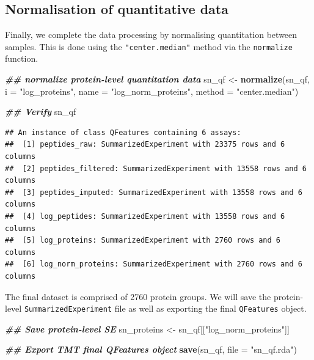 \documentclass[9pt,a4paper,]{extarticle}
\newenvironment{Shaded}{\begin{snugshade}}{\end{snugshade}}
\newcommand{\AttributeTok}[1]{\textcolor[rgb]{0.13,0.29,0.53}{#1}}
\newcommand{\DocumentationTok}[1]{\textcolor[rgb]{0.56,0.35,0.01}{\textbf{\textit{#1}}}}
\newcommand{\FunctionTok}[1]{\textcolor[rgb]{0.13,0.29,0.53}{\textbf{#1}}}
\newcommand{\NormalTok}[1]{#1}
\newcommand{\OtherTok}[1]{\textcolor[rgb]{0.56,0.35,0.01}{#1}}
\newcommand{\StringTok}[1]{\textcolor[rgb]{0.31,0.60,0.02}{#1}}
\begin{document}
\subsection{Normalisation of quantitative data}\label{normalisation-of-quantitative-data-1}

Finally, we complete the data processing by normalising quantitation between
samples. This is done using the \texttt{"center.median"} method via the \texttt{normalize}
function.

\begin{Shaded}
\begin{Highlighting}[]
\DocumentationTok{\#\# normalize protein{-}level quantitation data}
\NormalTok{sn\_qf }\OtherTok{\textless{}{-}} \FunctionTok{normalize}\NormalTok{(sn\_qf,}
                   \AttributeTok{i =} \StringTok{"log\_proteins"}\NormalTok{,}
                   \AttributeTok{name =} \StringTok{"log\_norm\_proteins"}\NormalTok{,}
                   \AttributeTok{method =} \StringTok{"center.median"}\NormalTok{)}

\DocumentationTok{\#\# Verify}
\NormalTok{sn\_qf}
\end{Highlighting}
\end{Shaded}

\begin{verbatim}
## An instance of class QFeatures containing 6 assays:
##  [1] peptides_raw: SummarizedExperiment with 23375 rows and 6 columns 
##  [2] peptides_filtered: SummarizedExperiment with 13558 rows and 6 columns 
##  [3] peptides_imputed: SummarizedExperiment with 13558 rows and 6 columns 
##  [4] log_peptides: SummarizedExperiment with 13558 rows and 6 columns 
##  [5] log_proteins: SummarizedExperiment with 2760 rows and 6 columns 
##  [6] log_norm_proteins: SummarizedExperiment with 2760 rows and 6 columns
\end{verbatim}

The final dataset is comprised of 2760 protein
groups. We will save the protein-level \texttt{SummarizedExperiment} file as well as
exporting the final \texttt{QFeatures} object.

\begin{Shaded}
\begin{Highlighting}[]
\DocumentationTok{\#\# Save protein{-}level SE}
\NormalTok{sn\_proteins }\OtherTok{\textless{}{-}}\NormalTok{ sn\_qf[[}\StringTok{"log\_norm\_proteins"}\NormalTok{]]}

\DocumentationTok{\#\# Export TMT final QFeatures object}
\FunctionTok{save}\NormalTok{(sn\_qf, }\AttributeTok{file =} \StringTok{"sn\_qf.rda"}\NormalTok{)}
\end{Highlighting}
\end{Shaded}
\end{document}
